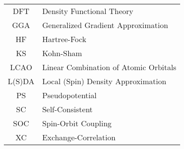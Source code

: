 
\begin{tabular}{cl}
DFT & Density Functional Theory \\
GGA & Generalized Gradient Approximation \\
HF & Hartree-Fock\\
KS & Kohn-Sham \\
LCAO & Linear Combination of Atomic Orbitals \\
L(S)DA & Local (Spin) Density Approximation \\
PS & Pseudopotential \\
SC & Self-Consistent \\
SOC & Spin-Orbit Coupling\\
XC & Exchange-Correlation \\
\end{tabular}
